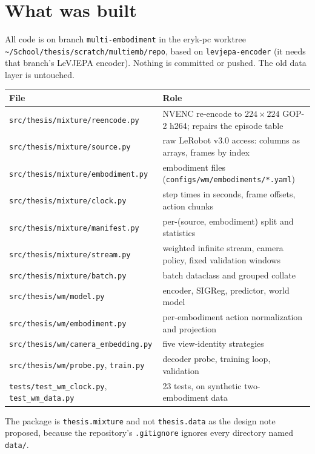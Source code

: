 \documentclass[10pt]{article}
\newcommand{\code}[1]{\texttt{\small #1}}
\begin{document}
\section{What was built}
All code is on branch \code{multi-embodiment} in the eryk-pc worktree
\code{\~{}/School/thesis/scratch/multiemb/repo}, based on \code{levjepa-encoder} (it needs that
branch's LeVJEPA encoder). Nothing is committed or pushed. The old data layer is untouched.

\begin{center}\small
\begin{tabular}{@{}ll@{}}
\toprule
File & Role \\
\midrule
\code{src/thesis/mixture/reencode.py} & NVENC re-encode to $224{\times}224$ GOP-2 h264; repairs the episode table \\
\code{src/thesis/mixture/source.py} & raw LeRobot v3.0 access: columns as arrays, frames by index \\
\code{src/thesis/mixture/embodiment.py} & embodiment files (\code{configs/wm/embodiments/*.yaml}) \\
\code{src/thesis/mixture/clock.py} & step times in seconds, frame offsets, action chunks \\
\code{src/thesis/mixture/manifest.py} & per-(source, embodiment) split and statistics \\
\code{src/thesis/mixture/stream.py} & weighted infinite stream, camera policy, fixed validation windows \\
\code{src/thesis/mixture/batch.py} & batch dataclass and grouped collate \\
\code{src/thesis/wm/model.py} & encoder, SIGReg, predictor, world model \\
\code{src/thesis/wm/embodiment.py} & per-embodiment action normalization and projection \\
\code{src/thesis/wm/camera\_embedding.py} & five view-identity strategies \\
\code{src/thesis/wm/probe.py}, \code{train.py} & decoder probe, training loop, validation \\
\code{tests/test\_wm\_clock.py}, \code{test\_wm\_data.py} & 23 tests, on synthetic two-embodiment data \\
\bottomrule
\end{tabular}
\end{center}

The package is \code{thesis.mixture} and not \code{thesis.data} as the design note proposed,
because the repository's \code{.gitignore} ignores every directory named \code{data/}.
\end{document}
